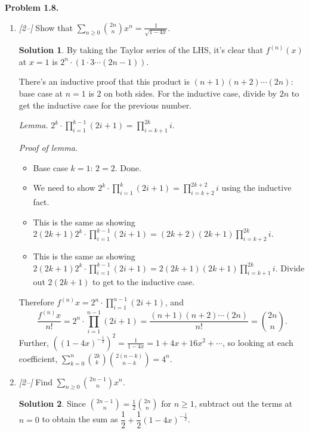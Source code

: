 \documentclass[11pt]{article}
\theoremstyle{definition}
\newtheorem*{solution}{Solution}
\newcounter{probnum}
\newcommand{\problem}[1]{%
  \setcounter{probnum}{#1}%
  \medskip
  \noindent\textbf{Problem 1.#1.}\quad
}
\begin{document}
\problem{8} \hfill

\begin{enumerate}[label=(\alph*)]
  \item \textit{[2--]} Show that
    $\displaystyle\sum_{n\geq 0}\binom{2n}{n}x^n = \frac{1}{\sqrt{1-4x}}$.
    \begin{solution}
    By taking the Taylor series of the LHS, it's clear that $f^{(n)}(x)$ at $x=1$
    is $2^n \cdot (1 \cdot 3 \cdots (2n-1))$.

    There's an inductive proof that this product is $(n+1)(n+2)\cdots(2n)$: base
    case at $n=1$ is 2 on both sides. For the inductive case, divide by $2n$ to get
    the inductive case for the previous number.

    \textit{Lemma.}
    $\displaystyle 2^k \cdot \prod_{i=1}^{k-1}(2i+1) = \prod_{i=k+1}^{2k} i$.

    \textit{Proof of lemma.}
    \begin{itemize}
      \item Base case $k=1$: $2 = 2$. Done.
      \item We need to show $2^{k} \cdot \prod_{i=1}^{k}(2i+1) = \prod_{i=k+2}^{2k+2} i$
        using the inductive fact.
      \item This is the same as showing
        $2(2k+1)2^{k} \cdot \prod_{i=1}^{k-1}(2i+1) = (2k+2)(2k+1)\prod_{i=k+2}^{2k} i$.
      \item This is the same as showing
        $2(2k+1)2^{k} \cdot \prod_{i=1}^{k-1}(2i+1) = 2(2k+1)(2k+1)\prod_{i=k+1}^{2k} i$.
        Divide out $2(2k+1)$ to get to the inductive case.
    \end{itemize}

    Therefore $f^{(n)}x = 2^n\cdot \prod_{i=1}^{n-1}(2i+1)$, and
    \[
      \frac{f^{(n)}x}{n!}
        = 2^n\cdot \prod_{i=1}^{n-1}(2i+1) %
        = \frac{(n+1)(n+2)\cdots(2n)}{n!} = \binom{2n}{n}.
    \]
    Further, $\left((1-4x)^{-\frac{1}{2}}\right)^2 = \frac{1}{1-4x} = 1+4x+16x^2+\cdots$,
    so looking at each coefficient,
    $\sum_{k=0}^{n}\binom{2k}{k}\binom{2(n-k)}{n-k} = 4^n$.
    \end{solution}

  \item \textit{[2--]} Find
    $\displaystyle\sum_{n\geq 0}\binom{2n-1}{n}x^n$.
    \begin{solution}
    Since $\binom{2n-1}{n} = \frac{1}{2}\binom{2n}{n}$ for $n\geq 1$, subtract out
    the terms at $n=0$ to obtain the sum as
    $\dfrac{1}{2} + \dfrac{1}{2}(1-4x)^{-\frac{1}{2}}$.
    \end{solution}
\end{enumerate}
\end{document}
